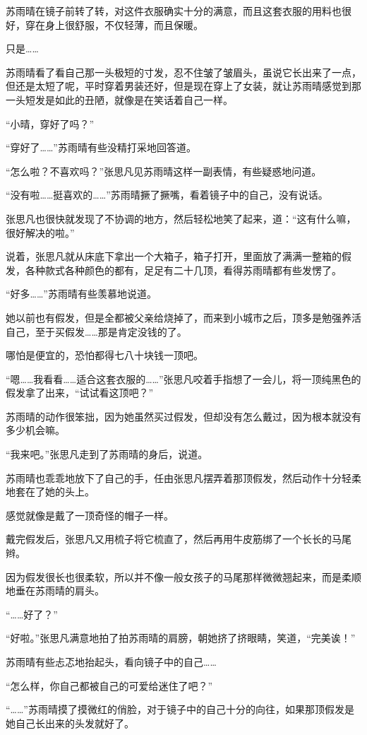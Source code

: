 苏雨晴在镜子前转了转，对这件衣服确实十分的满意，而且这套衣服的用料也很好，穿在身上很舒服，不仅轻薄，而且保暖。

只是……

苏雨晴看了看自己那一头极短的寸发，忍不住皱了皱眉头，虽说它长出来了一点，但还是太短了呢，平时穿着男装还好，但是现在穿上了女装，就让苏雨晴感觉到那一头短发是如此的丑陋，就像是在笑话着自己一样。

“小晴，穿好了吗？”

“穿好了……”苏雨晴有些没精打采地回答道。

“怎么啦？不喜欢吗？”张思凡见苏雨晴这样一副表情，有些疑惑地问道。

“没有啦……挺喜欢的……”苏雨晴撅了撅嘴，看着镜子中的自己，没有说话。

张思凡也很快就发现了不协调的地方，然后轻松地笑了起来，道：“这有什么嘛，很好解决的啦。”

说着，张思凡就从床底下拿出一个大箱子，箱子打开，里面放了满满一整箱的假发，各种款式各种颜色的都有，足足有二十几顶，看得苏雨晴都有些发愣了。

“好多……”苏雨晴有些羡慕地说道。

她以前也有假发，但是全都被父亲给烧掉了，而来到小城市之后，顶多是勉强养活自己，至于买假发……那是肯定没钱的了。

哪怕是便宜的，恐怕都得七八十块钱一顶吧。

“嗯……我看看……适合这套衣服的……”张思凡咬着手指想了一会儿，将一顶纯黑色的假发拿了出来，“试试看这顶吧？”

苏雨晴的动作很笨拙，因为她虽然买过假发，但却没有怎么戴过，因为根本就没有多少机会嘛。

“我来吧。”张思凡走到了苏雨晴的身后，说道。

苏雨晴也乖乖地放下了自己的手，任由张思凡摆弄着那顶假发，然后动作十分轻柔地套在了她的头上。

感觉就像是戴了一顶奇怪的帽子一样。

戴完假发后，张思凡又用梳子将它梳直了，然后再用牛皮筋绑了一个长长的马尾辫。

因为假发很长也很柔软，所以并不像一般女孩子的马尾那样微微翘起来，而是柔顺地垂在苏雨晴的肩头。

“……好了？”

“好啦。”张思凡满意地拍了拍苏雨晴的肩膀，朝她挤了挤眼睛，笑道，“完美诶！”

苏雨晴有些忐忑地抬起头，看向镜子中的自己……

“怎么样，你自己都被自己的可爱给迷住了吧？”

“……”苏雨晴摸了摸微红的俏脸，对于镜子中的自己十分的向往，如果那顶假发是她自己长出来的头发就好了。


